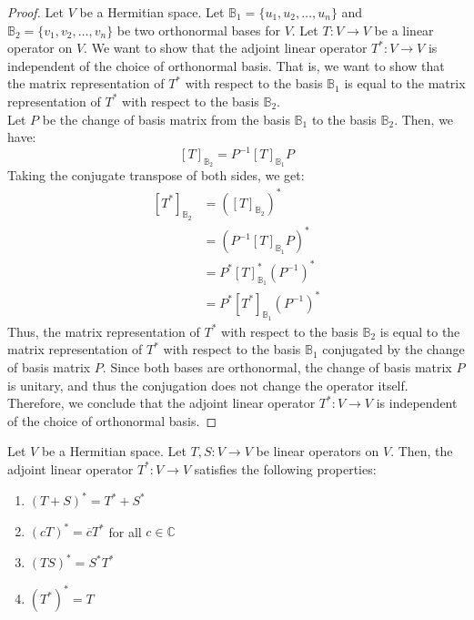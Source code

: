 \documentclass[openany]{book}
\renewcommand{\C}{\mathbb{C}}
\begin{document}
\begin{proof}
Let $V$ be a Hermitian space. Let $\mathbb{B}_1 = \{u_1, u_2, \ldots, u_n\}$ and $\mathbb{B}_2 = \{v_1, v_2, \ldots, v_n\}$ be two orthonormal bases for $V$. Let $T: V \to V$ be a linear operator on $V$. We want to show that the adjoint linear operator $T^*: V \to V$ is independent of the choice of orthonormal basis. That is, we want to show that the matrix representation of $T^*$ with respect to the basis $\mathbb{B}_1$ is equal to the matrix representation of $T^*$ with respect to the basis $\mathbb{B}_2$. \\
Let $P$ be the change of basis matrix from the basis $\mathbb{B}_1$ to the basis $\mathbb{B}_2$. Then, we have:
$$[T]_{\mathbb{B}_2} = P^{-1} [T]_{\mathbb{B}_1} P$$
Taking the conjugate transpose of both sides, we get:
\[\begin{aligned}
[T^*]_{\mathbb{B}_2} &= ([T]_{\mathbb{B}_2})^* \\
&= (P^{-1} [T]_{\mathbb{B}_1} P)^* \\
&= P^* [T]_{\mathbb{B}_1}^* (P^{-1})^* \\
&= P^* [T^*]_{\mathbb{B}_1} (P^{-1})^*
\end{aligned}\]
Thus, the matrix representation of $T^*$ with respect to the basis $\mathbb{B}_2$ is equal to the matrix representation of $T^*$ with respect to the basis $\mathbb{B}_1$ conjugated by the change of basis matrix $P$. Since both bases are orthonormal, the change of basis matrix $P$ is unitary, and thus the conjugation does not change the operator itself. Therefore, we conclude that the adjoint linear operator $T^*: V \to V$ is independent of the choice of orthonormal basis.
\end{proof}
\begin{mytheorem}
Let $V$ be a Hermitian space. Let $T, S: V \to V$ be linear operators on $V$. Then, the adjoint linear operator $T^*: V \to V$ satisfies the following properties:
\begin{enumerate}
    \item $(T + S)^* = T^* + S^*$
    \item $(cT)^* = \overline{c} T^*$ for all $c \in \C$
    \item $(TS)^* = S^* T^*$
    \item $(T^*)^* = T$
\end{enumerate}
\end{mytheorem}
\end{document}
